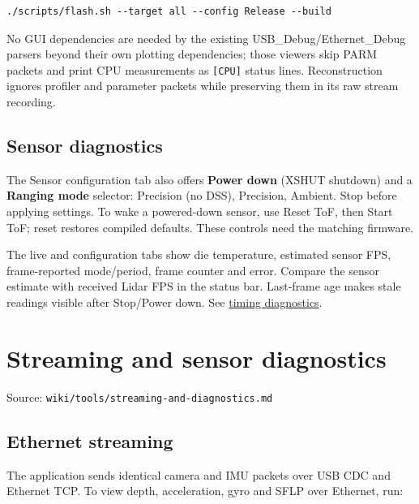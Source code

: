 \documentclass[10pt,a4paper,oneside]{report}
\begin{document}
\begin{verbatim}
./scripts/flash.sh --target all --config Release --build
\end{verbatim}

No GUI dependencies are needed by the existing USB\_Debug/Ethernet\_Debug parsers beyond their own plotting dependencies; those viewers skip PARM packets and print CPU measurements as \texttt{[CPU]} status lines. Reconstruction ignores profiler and parameter packets while preserving them in its raw stream recording.

\section{Sensor diagnostics}\label{wiki-tools-device-monitor--sensor-diagnostics}

The Sensor configuration tab also offers \textbf{Power down} (XSHUT shutdown) and a \textbf{Ranging mode} selector: Precision (no DSS), Precision, Ambient. Stop before applying settings. To wake a powered-down sensor, use Reset ToF, then Start ToF; reset restores compiled defaults. These controls need the matching firmware.

The live and configuration tabs show die temperature, estimated sensor FPS, frame-reported mode/period, frame counter and error. Compare the sensor estimate with received Lidar FPS in the status bar. Last-frame age makes stale readings visible after Stop/Power down. See \hyperref[wiki-tools-streaming-and-diagnostics--gaming-mode-frame-rate-and-temperature]{timing diagnostics}.

\chapter{Streaming and sensor diagnostics}\label{wiki-tools-streaming-and-diagnostics--streaming-and-sensor-diagnostics}

{\small\color{MGSMuted}Source: \nolinkurl{wiki/tools/streaming-and-diagnostics.md}\par}\medskip

\section{Ethernet streaming}\label{wiki-tools-streaming-and-diagnostics--ethernet-streaming}

The application sends identical camera and IMU packets over USB CDC and Ethernet TCP. To view depth, acceleration, gyro and SFLP over Ethernet, run:
\end{document}
